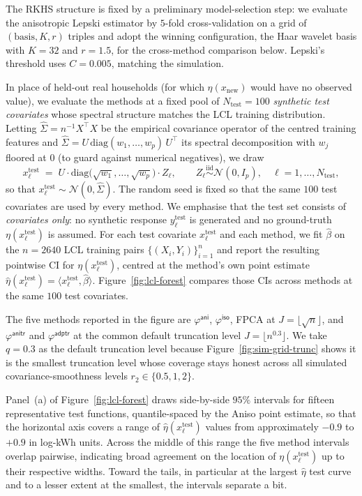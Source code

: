 \documentclass[11pt,a4paper]{article}
\renewcommand{\hat}{\widehat}
\theoremstyle{definition}
\theoremstyle{plain}
\theoremstyle{remark}
\newcommand{\iso}{\mathsf{iso}}
\newcommand{\ani}{\mathsf{ani}}
\newcommand{\anitr}{\mathsf{anitr}}
\newcommand{\adptr}{\mathsf{adptr}}
\begin{document}
The RKHS structure is fixed by a preliminary model-selection step: we evaluate the anisotropic Lepski estimator by $5$-fold cross-validation on a grid of $(\text{basis}, K, r)$ triples and adopt the winning configuration, the Haar wavelet basis with $K = 32$ and $r = 1.5$, for the cross-method comparison below. Lepski's threshold uses $C = 0.005$, matching the simulation.

In place of held-out real households (for which $\eta(x_{\text{new}})$ would have no observed value), we evaluate the methods at a fixed pool of $N_{\text{test}} = 100$ \emph{synthetic test covariates} whose spectral structure matches the LCL training distribution. Letting $\hat\Sigma = n^{-1} X^\top X$ be the empirical covariance operator of the centred training features and $\hat\Sigma = U\,\mathrm{diag}(w_1, \ldots, w_p)\,U^\top$ its spectral decomposition with $w_j$ floored at $0$ (to guard against numerical negatives), we draw
\[
x_\ell^{\text{test}} \;=\; U \cdot \mathrm{diag}\!\big(\sqrt{w_1}, \ldots, \sqrt{w_p}\big) \cdot Z_\ell,
\qquad Z_\ell \overset{\text{iid}}{\sim} \mathcal N(0, I_p),
\quad \ell = 1, \ldots, N_{\text{test}},
\]
so that $x_\ell^{\text{test}} \sim \mathcal N(0, \hat\Sigma)$. The random seed is fixed so that the same $100$ test covariates are used by every method. We emphasise that the test set consists of \emph{covariates only}: no synthetic response $y_\ell^{\text{test}}$ is generated and no ground-truth $\eta(x_\ell^{\text{test}})$ is assumed. For each test covariate $x_\ell^{\text{test}}$ and each method, we fit $\hat\beta$ on the $n=2640$ LCL training pairs $\{(X_i, Y_i)\}_{i=1}^n$ and report the resulting pointwise CI for $\eta(x_\ell^{\text{test}})$, centred at the method's own point estimate $\hat\eta(x_\ell^{\text{test}}) = \langle x_\ell^{\text{test}}, \hat\beta\rangle$. Figure~\ref{fig:lcl-forest} compares those CIs across methods at the same $100$ test covariates.

The five methods reported in the figure are $\varphi^{\ani}$, $\varphi^{\iso}$, FPCA at $J=\lfloor\sqrt n\rfloor$, and $\varphi^{\anitr}$ and $\varphi^{\adptr}$ at the common default truncation level $J=\lfloor n^{0.3}\rfloor$. We take $q=0.3$ as the default truncation level because Figure~\ref{fig:sim-grid-trunc} shows it is the smallest truncation level whose coverage stays honest across all simulated covariance-smoothness levels $r_2\in\{0.5,1,2\}.$

Panel~(a) of Figure~\ref{fig:lcl-forest} draws side-by-side $95\%$ intervals for fifteen representative test functions, quantile-spaced by the Aniso point estimate, so that the horizontal axis covers a range of $\hat\eta(x_\ell^{\text{test}})$ values from approximately $-0.9$ to $+0.9$ in log-kWh units. Across the middle of this range the five method intervals overlap pairwise, indicating broad agreement on the location of $\eta(x_\ell^{\text{test}})$ up to their respective widths. Toward the tails, in particular at the largest $\hat\eta$ test curve and to a lesser extent at the smallest, the intervals separate a bit.
\end{document}
